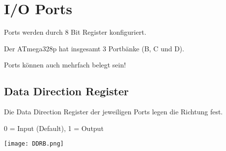 \raggedright

\section{I/O Ports}

Ports werden durch 8 Bit Register konfiguriert.

Der ATmega328p hat insgesamt 3 Portbänke (B, C und D).

Ports können auch mehrfach belegt sein!


\subsection{Data Direction Register}

Die Data Direction Register der jeweiligen Ports legen die Richtung fest.

0 = Input (Default), 1 = Output

\vspace{2em}
\texttt{[image: DDRB.png]}
\vspace{2em}

